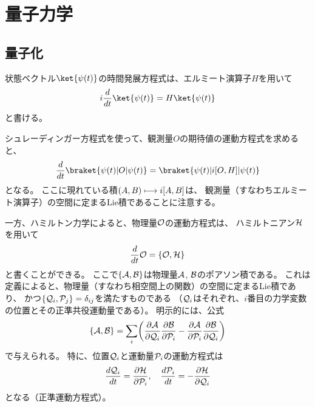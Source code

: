 \section{量子力学}

\subsection{量子化}
状態ベクトル$\ket{\psi(t)}$の時間発展方程式は、エルミート演算子$H$を用いて
\begin{equation}
  i\frac{d}{dt}\ket{\psi(t)} = H\ket{\psi(t)}
\end{equation}
と書ける。

シュレーディンガー方程式を使って、観測量$O$の期待値の運動方程式を求めると、
\begin{equation}
  \label{quantum-hamilton-equation-for-expectation}
  \frac{d}{dt}\braket{\psi(t)|O|\psi(t)} = \braket{\psi(t)|i[O, H]|\psi(t)}
\end{equation}
となる。
ここに現れている積$(A,B) \longmapsto i[A,B]$は、
観測量（すなわちエルミート演算子）の空間に定まるLie積であることに注意する。

一方、ハミルトン力学によると、物理量$\mathcal{O}$の運動方程式は、
ハミルトニアン$\mathcal{H}$を用いて
\begin{equation}
  \label{hamilton-equation}
  \frac{d}{dt}\mathcal{O} = \{\mathcal{O}, \mathcal{H}\}
\end{equation}
と書くことができる。
ここで$\{\mathcal{A},\mathcal{B}\}$は物理量$\mathcal{A}$, $\mathcal{B}$のポアソン積である。
これは定義によると、物理量（すなわち相空間上の関数）の空間に定まるLie積であり、
かつ$\{\mathcal{Q}_i,\mathcal{P}_j\}=\delta_{ij}$を満たすものである
（$\mathcal{Q}_i$はそれぞれ、$i$番目の力学変数の位置とその正準共役運動量である）。
明示的には、公式
\begin{equation}
  \label{poisson-bracket-formula}
  \{\mathcal{A},\mathcal{B}\}
  = \sum_i
  \biggl(
  \frac{\partial\mathcal{A}}{\partial\mathcal{Q}_i}\frac{\partial\mathcal{B}}{\partial\mathcal{P}_i} -
  \frac{\partial\mathcal{A}}{\partial\mathcal{P}_i}\frac{\partial\mathcal{B}}{\partial\mathcal{Q}_i}
  \biggr)
\end{equation}
で与えられる。
特に、位置$\mathcal{Q}_i$と運動量$\mathcal{P}_i$の運動方程式は
\begin{equation}
  \frac{d\mathcal{Q}_i}{dt}=\frac{\partial\mathcal{H}}{\partial\mathcal{P}_i}, \quad
  \frac{d\mathcal{P}_i}{dt}=-\frac{\partial\mathcal{H}}{\partial\mathcal{Q}_i}
\end{equation}
となる（正準運動方程式）。

